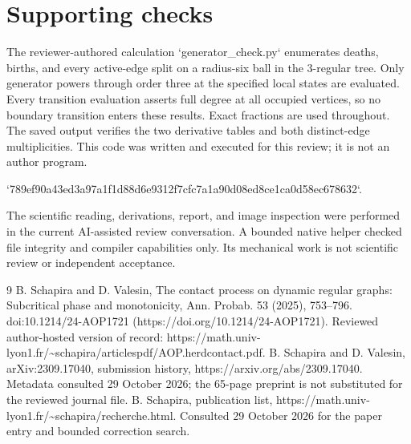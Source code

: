 \documentclass[10pt]{article}
\begin{document}
\section*{Supporting checks}
The reviewer-authored calculation `generator\_check.py` enumerates deaths, births, and every active-edge split on a radius-six ball in the 3-regular tree. Only generator powers through order three at the specified local states are evaluated. Every transition evaluation asserts full degree at all occupied vertices, so no boundary transition enters these results. Exact fractions are used throughout. The saved output verifies the two derivative tables and both distinct-edge multiplicities. This code was written and executed for this review; it is not an author program.\par
`789ef90a43ed3a97a1f1d88d6e9312f7cfc7a1a90d08ed8ce1ca0d58ec678632`.\par
The scientific reading, derivations, report, and image inspection were performed in the current AI-assisted review conversation. A bounded native helper checked file integrity and compiler capabilities only. Its mechanical work is not scientific review or independent acceptance.\par
9 B. Schapira and D. Valesin, The contact process on dynamic regular graphs: Subcritical phase and monotonicity, Ann. Probab. 53 (2025), 753–796. doi:10.1214/24-AOP1721 (https://doi.org/10.1214/24-AOP1721). Reviewed author-hosted version of record: https://math.univ-lyon1.fr/\textasciitilde{}schapira/articlespdf/AOP.herdcontact.pdf. B. Schapira and D. Valesin, arXiv:2309.17040, submission history, https://arxiv.org/abs/2309.17040. Metadata consulted 29 October 2026; the 65-page preprint is not substituted for the reviewed journal file. B. Schapira, publication list, https://math.univ-lyon1.fr/\textasciitilde{}schapira/recherche.html. Consulted 29 October 2026 for the paper entry and bounded correction search.\par
\end{document}
